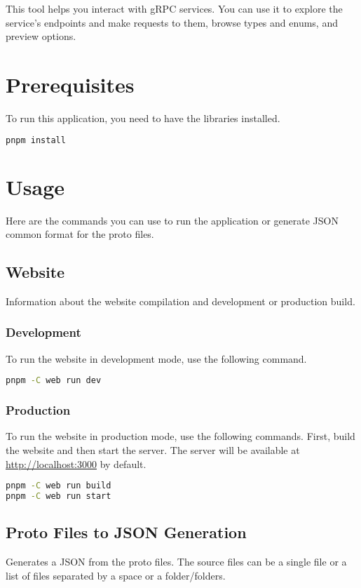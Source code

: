 This tool helps you interact with gRPC services.
You can use it to explore the service's endpoints and make requests to them, browse types and enums, and preview options.


\section{Prerequisites}
To run this application, you need to have the libraries installed.

\begin{lstlisting}[language=bash, label={lst:documentation-install}]
pnpm install
\end{lstlisting}


\section{Usage}
Here are the commands you can use to run the application or generate JSON common format for the proto files.

\subsection{Website}
Information about the website compilation and development or production build.

\subsubsection{Development}
To run the website in development mode, use the following command.

\begin{lstlisting}[language=bash, label={lst:documentation-web-dev}]
pnpm -C web run dev
\end{lstlisting}

\subsubsection{Production}
To run the website in production mode, use the following commands.
First, build the website and then start the server.
The server will be available at \url{http://localhost:3000} by default.

\begin{lstlisting}[language=bash, label={lst:documentation-web-build}]
pnpm -C web run build
pnpm -C web run start
\end{lstlisting}

\subsection{Proto Files to JSON Generation}
Generates a JSON from the proto files.
The source files can be a single file or a list of files separated by a space or a folder/folders.


